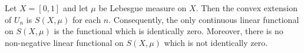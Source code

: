 Let $X = [0,1]$ and let $\mu$ be Lebesgue measure on $X$. Then the convex extension of $U_n$ is $S(X, \mu)$ for each $n$. Consequently, the only continuous linear functional on $S(X, \mu)$ is the functional which is identically zero. Moreover, there is no non-negative linear functional on $S(X, \mu)$ which is not identically zero.
